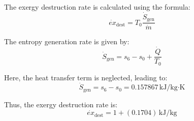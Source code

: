 The exergy destruction rate is calculated using the formula:  
\[
\dot{ex}_{\text{dest}} = T_0 \frac{\dot{S}_{\text{gen}}}{\dot{m}}
\]  

The entropy generation rate is given by:  
\[
\dot{S}_{\text{gen}} = s_6 - s_0 + \frac{\dot{Q}}{T_0}
\]  

Here, the heat transfer term is neglected, leading to:  
\[
\dot{S}_{\text{gen}} = s_6 - s_0 = 0.157867 \, \text{kJ/kg·K}
\]  

Thus, the exergy destruction rate is:  
\[
\dot{ex}_{\text{dest}} = 1 + (0.1704) \, \text{kJ/kg}
\]